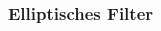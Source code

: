 \documentclass[ngerman, aspectratio=169, xcolor={rgb}]{beamer}
\begin{document}
	\begin{frame}
		\frametitle{Elliptisches Filter}

		\begin{columns}

			\begin{column}[T]{0.5\textwidth}

				\begin{center}
					\resizebox{\textwidth}{!}{
					
					}
				\end{center}

			\end{column}
			\begin{column}[T]{0.5\textwidth}

				\begin{center}
					\resizebox{\textwidth}{!}{
					
					}
				\end{center}

			\end{column}
		\end{columns}

	\end{frame}

	
\end{document}
